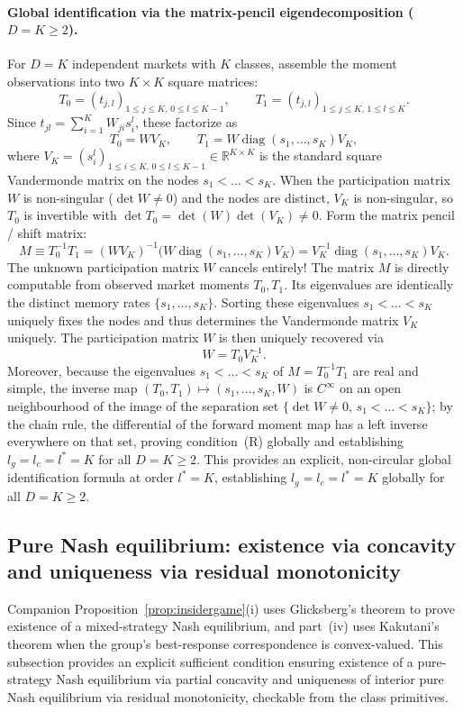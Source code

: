 \documentclass[12pt]{article}
\theoremstyle{definition}
\theoremstyle{remark}
\begin{document}
\paragraph{Global identification via the matrix-pencil eigendecomposition ($D=K\ge2$).} For $D=K$ independent markets with $K$ classes, assemble the moment observations into two $K\times K$ square matrices:
\[
T_0 = (t_{j,l})_{1\le j\le K,\,0\le l\le K-1},\qquad T_1 = (t_{j,l})_{1\le j\le K,\,1\le l\le K}.
\]
Since $t_{jl}=\sum_{i=1}^K W_{ji}s_i^l$, these factorize as
\[
T_0 = W V_K,\qquad T_1 = W \operatorname{diag}(s_1,\dots,s_K) V_K,
\]
where $V_K=(s_i^l)_{1\le i\le K,\,0\le l\le K-1}\in\mathbb{R}^{K\times K}$ is the standard square Vandermonde matrix on the nodes $s_1<\dots<s_K$. When the participation matrix $W$ is non-singular ($\det W\ne0$) and the nodes are distinct, $V_K$ is non-singular, so $T_0$ is invertible with $\det T_0 = \det(W)\det(V_K)\ne0$. Form the matrix pencil / shift matrix:
\[
M \equiv T_0^{-1}T_1 = (W V_K)^{-1}\bigl(W \operatorname{diag}(s_1,\dots,s_K) V_K\bigr) = V_K^{-1}\operatorname{diag}(s_1,\dots,s_K) V_K.
\]
The unknown participation matrix $W$ cancels entirely! The matrix $M$ is directly computable from observed market moments $T_0, T_1$. Its eigenvalues are identically the distinct memory rates $\{s_1,\dots,s_K\}$. Sorting these eigenvalues $s_1<\dots<s_K$ uniquely fixes the nodes and thus determines the Vandermonde matrix $V_K$ uniquely. The participation matrix $W$ is then uniquely recovered via
\[
W = T_0 V_K^{-1}.
\]
Moreover, because the eigenvalues $s_1 < \dots < s_K$ of $M = T_0^{-1}T_1$ are real and simple, the inverse map $(T_0, T_1) \mapsto (s_1,\dots,s_K, W)$ is $C^\infty$ on an open neighbourhood of the image of the separation set $\{\det W \ne 0,\, s_1 < \dots < s_K\}$; by the chain rule, the differential of the forward moment map has a left inverse everywhere on that set, proving condition~(R) globally and establishing $l_g = l_c = l^* = K$ for all $D = K \ge 2$.
This provides an explicit, non-circular global identification formula at order $l^*=K$, establishing $l_g=l_c=l^*=K$ globally for all $D=K\ge2$.

\subsection{Pure Nash equilibrium: existence via concavity and uniqueness via residual monotonicity}\label{app:nashtight}

Companion Proposition~\ref{prop:insidergame}(i) uses Glicksberg's theorem to prove existence of a mixed-strategy Nash equilibrium, and part~(iv) uses Kakutani's theorem when the group's best-response correspondence is convex-valued. This subsection provides an explicit sufficient condition ensuring existence of a pure-strategy Nash equilibrium via partial concavity and uniqueness of interior pure Nash equilibrium via residual monotonicity, checkable from the class primitives.
\end{document}
